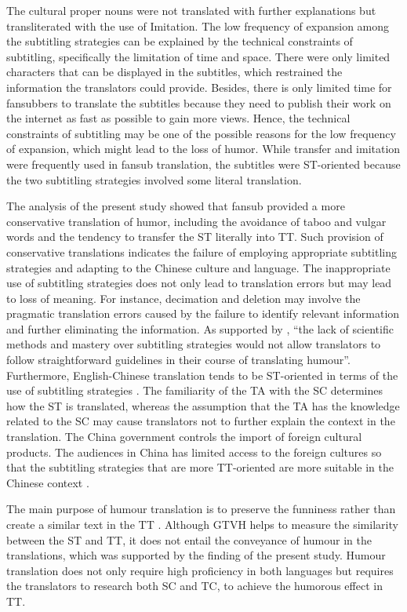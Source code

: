 \documentclass[english]{textolivre}
\begin{document}
The cultural proper nouns were not translated with further explanations but transliterated with the use of Imitation. The low frequency of expansion among the subtitling strategies can be explained by the technical constraints of subtitling, specifically the limitation of time and space. There were only limited characters that can be displayed in the subtitles, which restrained the information the translators could provide. Besides, there is only limited time for fansubbers to translate the subtitles because they need to publish their work on the internet as fast as possible to gain more views. Hence, the technical constraints of subtitling may be one of the possible reasons for the low frequency of expansion, which might lead to the loss of humor. While transfer and imitation were frequently used in fansub translation, the subtitles were ST-oriented because the two subtitling strategies involved some literal translation. 

The analysis of the present study showed that fansub provided a more conservative translation of humor, including the avoidance of taboo and vulgar words and the tendency to transfer the ST literally into TT. Such provision of conservative translations indicates the failure of employing appropriate subtitling strategies and adapting to the Chinese culture and language. The inappropriate use of subtitling strategies does not only lead to translation errors but may lead to loss of meaning. For instance, decimation and deletion may involve the pragmatic translation errors caused by the failure to identify relevant information and further eliminating the information. As supported by \textcite[p. 77]{kianbakht_audiovisual_2015}, “the lack of scientific methods and mastery over subtitling strategies would not allow translators to follow straightforward guidelines in their course of translating humour”. Furthermore, English-Chinese translation tends to be ST-oriented in terms of the use of subtitling strategies \cite{cheng_chinese_2014}. The familiarity of the TA with the SC determines how the ST is translated, whereas the assumption that the TA has the knowledge related to the SC may cause translators not to further explain the context in the translation. The China government controls the import of foreign cultural products. The audiences in China has limited access to the foreign cultures so that the subtitling strategies that are more TT-oriented are more suitable in the Chinese context \cite{hsieh_translation_2010}. 

The main purpose of humour translation is to preserve the funniness rather than create a similar text in the TT \cite{zabalbeascoa_humor_2005}. Although GTVH helps to measure the similarity between the ST and TT, it does not entail the conveyance of humour in the translations, which was supported by the finding of the present study. Humour translation does not only require high proficiency in both languages but requires the translators to research both SC and TC, to achieve the humorous effect in TT.  
\end{document}
